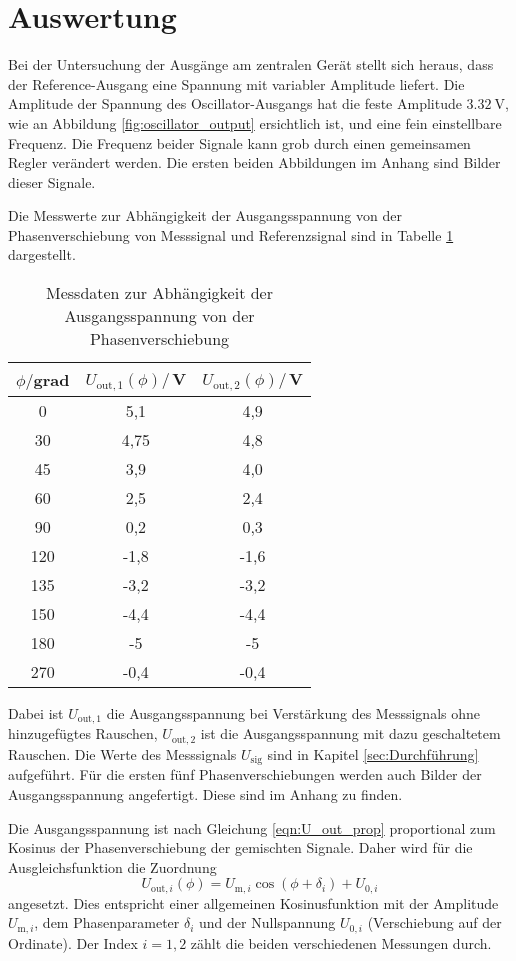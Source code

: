 \section{Auswertung}
\label{sec:Auswertung}

Bei der Untersuchung der Ausgänge am zentralen Gerät stellt sich heraus, dass
der Reference-Ausgang eine Spannung mit variabler Amplitude liefert. Die Amplitude
der Spannung des Oscillator-Ausgangs hat die feste Amplitude $\SI{3,32}{\volt}$,
wie an Abbildung \ref{fig:oscillator_output} ersichtlich ist, und eine fein einstellbare
Frequenz. Die Frequenz beider Signale kann grob durch einen gemeinsamen Regler verändert
werden. Die ersten beiden Abbildungen im Anhang sind Bilder dieser Signale.

Die Messwerte zur Abhängigkeit der Ausgangsspannung von der Phasenverschiebung
von Messsignal und Referenzsignal sind in Tabelle \ref{tab:phase} dargestellt.

\begin{table}
\centering
\caption{Messdaten zur Abhängigkeit der Ausgangsspannung von der Phasenverschiebung}
\label{tab:phase}
\begin{tabular}{c c c}
\toprule
$\phi/$grad & $U_\mathrm{out,1}(\phi)/$\,V & $U_\mathrm{out,2}(\phi)/$\,V \\
\midrule
  0	& 5,1	 & 4,9  \\
 30	&	4,75 & 4,8  \\
 45	&	3,9	 & 4,0  \\
 60	&	2,5	 & 2,4  \\
 90	&	0,2	 & 0,3  \\
120 &	-1,8 & -1,6 \\
135 &	-3,2 & -3,2 \\
150 &	-4,4 & -4,4 \\
180 &	-5   & -5   \\
270 &	-0,4 & -0,4 \\
\bottomrule
\end{tabular}
\end{table}

Dabei ist $U_\mathrm{out,1}$ die Ausgangsspannung bei Verstärkung des Messsignals
ohne hinzugefügtes Rauschen, $U_\mathrm{out,2}$ ist die Ausgangsspannung mit dazu geschaltetem
Rauschen. Die Werte des Messsignals $U_\mathrm{sig}$ sind in Kapitel \ref{sec:Durchführung}
aufgeführt.
Für die ersten fünf Phasenverschiebungen werden auch Bilder der Ausgangsspannung
angefertigt. Diese sind im Anhang zu finden.

Die Ausgangsspannung ist nach Gleichung \eqref{eqn:U_out_prop} proportional zum Kosinus der
Phasenverschiebung der gemischten Signale. Daher wird für die Ausgleichsfunktion
die Zuordnung
\begin{equation}
  U_{\mathrm{out,}i}(\phi) = U_{\mathrm{m,}i} \cos(\phi+\delta_i)+ U_{0,i}
  \label{eqn:fit}
\end{equation}
angesetzt. Dies entspricht einer allgemeinen Kosinusfunktion mit der Amplitude
$U_{\mathrm{m},i}$, dem Phasenparameter $\delta_i$ und der Nullspannung $U_{0,i}$ (Verschiebung
auf der Ordinate). Der Index $i=1,2$ zählt die beiden verschiedenen Messungen durch.


